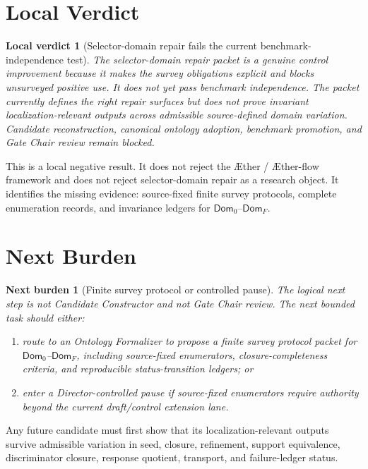 \documentclass[11pt]{article}
\newcommand{\Aether}{\AE{}ther}
\newcommand{\Aflow}{\AE{}ther-flow}
\newcommand{\TheoryProgram}{\Aether{} / \Aflow{} framework}
\newcommand{\Dom}{\mathsf{Dom}}
\newtheorem{verdict}{Local verdict}
\newtheorem{nextburden}{Next burden}
\begin{document}
\section{Local Verdict}

\begin{verdict}[Selector-domain repair fails the current benchmark-independence test]
The selector-domain repair packet is a genuine control improvement because it
makes the survey obligations explicit and blocks unsurveyed positive use. It
does not yet pass benchmark independence. The packet currently defines the
right repair surfaces but does not prove invariant localization-relevant
outputs across admissible source-defined domain variation. Candidate
reconstruction, canonical ontology adoption, benchmark promotion, and Gate
Chair review remain blocked.
\end{verdict}

This is a local negative result. It does not reject the \TheoryProgram{} and
does not reject selector-domain repair as a research object. It identifies
the missing evidence: source-fixed finite survey protocols, complete
enumeration records, and invariance ledgers for \(\Dom_0\)--\(\Dom_F\).

\section{Next Burden}

\begin{nextburden}[Finite survey protocol or controlled pause]
The logical next step is not Candidate Constructor and not Gate Chair review.
The next bounded task should either:
\begin{enumerate}
    \item route to an Ontology Formalizer to propose a finite survey protocol
    packet for \(\Dom_0\)--\(\Dom_F\), including source-fixed enumerators,
    closure-completeness criteria, and reproducible status-transition
    ledgers; or
    \item enter a Director-controlled pause if source-fixed enumerators
    require authority beyond the current draft/control extension lane.
\end{enumerate}
\end{nextburden}

Any future candidate must first show that its localization-relevant outputs
survive admissible variation in seed, closure, refinement, support
equivalence, discriminator closure, response quotient, transport, and
failure-ledger status.
\end{document}

